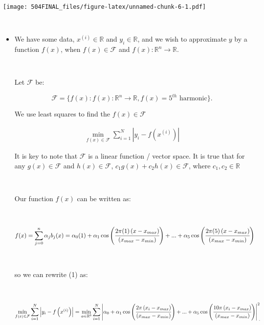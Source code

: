 \documentclass[]{article}
\begin{document}
\texttt{[image: 504FINAL\_files/figure-latex/unnamed-chunk-6-1.pdf]}

~

\begin{itemize} \item[] 
We have some data, $x^{(i)} \in \mathbb{R}$ and $y_i \in \mathbb{R}$, and we wish to approximate $y$ by a function $f(x)$, when $f(x) \in \mathcal{F}$ and $f(x): \mathbb{R}^n \rightarrow \mathbb{R}$.

\ 

Let $\mathcal{F}$ be:


\begin{equation*} 
\mathcal{F} = \{ f(x): f(x): \mathbb{R}^n \rightarrow \mathbb{R}, f(x) = 5^{th} \text{ harmonic} \} . 
\end{equation*}


We use least squares to find the $f(x) \in \mathcal{F}$

\begin{align}
     \min\limits_{f(x) \in \mathcal{F} } \sum\limits_{i=1}^N \left| y_i - f\left(x^{(i)} \right) \right|
\end{align} 
 
 
 It is key to note that $\mathcal{F}$ is a linear function / vector space. It is true that for any $g(x) \in \mathcal{F}$ and $h(x) \in \mathcal{F}$, $c_1 g(x) + c_2 h(x) \in \mathcal{F}$, where $c_1,c_2 \in \mathbb{R}$
 
 \ 
 
 
 Our function $f(x)$ can be written as:
 
 \ 
 
\begin{align*} f(x) &= \sum_{j=0}^n \alpha_j b_j(x) = \alpha_0 (1) + \alpha_1 \cos\left(
    \cfrac{2\pi(1)\left(x-x_{max}\right)}{\left(x_{max}-x_{min}\right)} \right) + ...  + \alpha_5 \cos\left(
    \cfrac{2\pi(5)\left(x-x_{max}\right)}{\left(x_{max}-x_{min}\right)} \right) 
    \end{align*} 
 
 \ 
 
 so we can rewrite (1) as:
 
\ 

\hspace{-1 cm}
\begin{align}
     \min\limits_{f(x) \in \mathcal{F} } \sum\limits_{i=1}^N \left| y_i - f\left(x^{(i)} \right) \right| =
     \min\limits_{\alpha \in \mathbb{R}^6 } \sum\limits_{i=1}^N \left|\alpha_0 + \alpha_1 \cos\left(
    \cfrac{2\pi\left(x_i-x_{max}\right)}{\left(x_{max}-x_{min}\right)} \right) + ...  + \alpha_5 \cos\left(
    \cfrac{10\pi\left(x_i-x_{max}\right)}{\left(x_{max}-x_{min}\right)} \right)  \right|^2_{\text{ .} }
\end{align}
 

\end{itemize}
\end{document}
